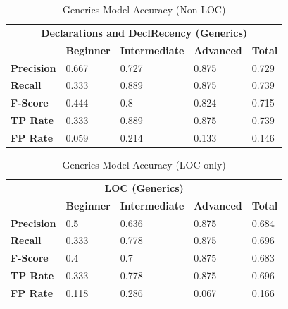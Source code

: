\begin{table}
	\centering
	\caption{Generics Model Accuracy (Non-LOC)}
	\label{tab:gen}
	\begin{tabular}{lllll}
		\toprule
		\multicolumn{5}{c}{\textbf{Declarations and DeclRecency (Generics)}}                                                            \\
		\cmidrule(lr){1-5}
		& \textbf{Beginner} & \textbf{Intermediate} & \textbf{Advanced} & \textbf{Total} \\
		\midrule
		\textbf{Precision} & 0.667             & 0.727                 & 0.875             & 0.729          \\
		\textbf{Recall}    & 0.333             & 0.889                 & 0.875             & 0.739          \\
		\textbf{F-Score}   & 0.444             & 0.8                   & 0.824             & 0.715          \\
		\textbf{TP Rate}   & 0.333             & 0.889                 & 0.875             & 0.739          \\
		\textbf{FP Rate}   & 0.059             & 0.214                 & 0.133             & 0.146         \\
		\bottomrule
	\end{tabular}
\end{table}

\begin{table}
	\centering
	\caption{Generics Model Accuracy (LOC only)}
	\label{tab:loc}
	\begin{tabular}{lllll}
		\toprule
		\multicolumn{5}{c}{\textbf{LOC (Generics)}}                                                         \\
		\cmidrule(lr){1-5}
		& \textbf{Beginner} & \textbf{Intermediate} & \textbf{Advanced} & \textbf{Total} \\
		\midrule
		\textbf{Precision} & 0.5               & 0.636                 & 0.875             & 0.684          \\
		\textbf{Recall}    & 0.333             & 0.778                 & 0.875             & 0.696          \\
		\textbf{F-Score}   & 0.4               & 0.7                   & 0.875             & 0.683          \\
		\textbf{TP Rate}   & 0.333             & 0.778                 & 0.875             & 0.696          \\
		\textbf{FP Rate}   & 0.118             & 0.286                 & 0.067             & 0.166         \\
		\bottomrule
	\end{tabular}
\end{table}

